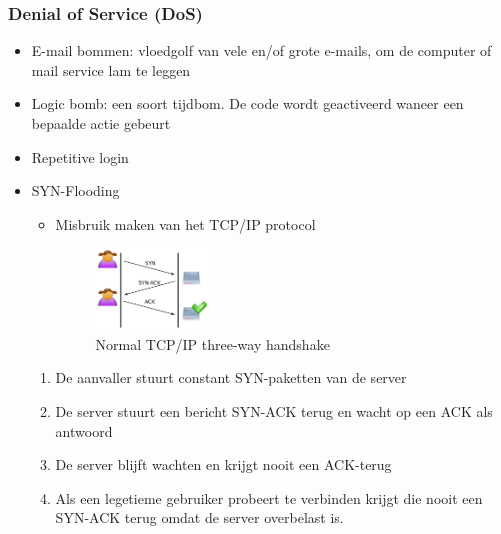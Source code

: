 \documentclass{article}
\begin{document}
\subsubsection{Denial of Service (DoS)}
\begin{itemize}
    \item E-mail bommen: vloedgolf van vele en/of grote e-mails, om de computer of mail service lam te leggen
    \item Logic bomb: een soort tijdbom. De code wordt geactiveerd waneer een bepaalde actie gebeurt
    \item Repetitive login
    \item SYN-Flooding
    \begin{itemize}
        \item Misbruik maken van het TCP/IP protocol
        \begin{figure}[H]
            \centering
            \includegraphics[width=0.3\textwidth]{tcp-normal.png}
            \caption{Normal TCP/IP three-way handshake}
        \end{figure}
    \end{itemize}
    \begin{enumerate}
        \item De aanvaller stuurt constant SYN-paketten van de server
        \item De server stuurt een bericht SYN-ACK terug en wacht op een ACK als antwoord
        \item De server blijft wachten en krijgt nooit een ACK-terug
        \item Als een legetieme gebruiker probeert te verbinden krijgt die nooit een SYN-ACK terug omdat de server overbelast is.
    \end{enumerate}



\end{itemize}
\end{document}
